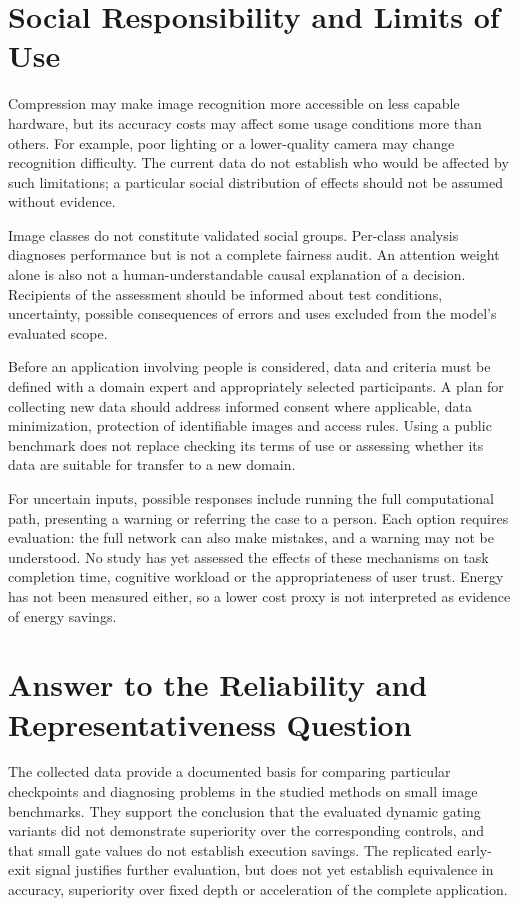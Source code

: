\documentclass[12pt,a4paper]{article}
\begin{document}
\section{Social Responsibility and Limits of Use}

Compression may make image recognition more accessible on less capable
hardware, but its accuracy costs may affect some usage conditions
more than others.
For example, poor lighting or a lower-quality camera may change
recognition difficulty.
The current data do not establish who would be affected by such
limitations; a particular social distribution of effects should not
be assumed without evidence.

Image classes do not constitute validated social groups.
Per-class analysis diagnoses performance but is not a complete fairness
audit. An attention weight alone is also not a human-understandable
causal explanation of a decision.
Recipients of the assessment should be informed about test conditions,
uncertainty, possible consequences of errors and uses excluded
from the model's evaluated scope.

Before an application involving people is considered, data and criteria
must be defined with a domain expert and appropriately selected
participants.
A plan for collecting new data should address informed consent where
applicable, data minimization, protection of identifiable images
and access rules.
Using a public benchmark does not replace checking its terms of use
or assessing whether its data are suitable for transfer to a new domain.

For uncertain inputs, possible responses include running the full
computational path, presenting a warning or referring the case to
a person. Each option requires evaluation: the full network can also
make mistakes, and a warning may not be understood.
No study has yet assessed the effects of these mechanisms on task
completion time, cognitive workload or the appropriateness of user trust.
Energy has not been measured either, so a lower cost proxy is not
interpreted as evidence of energy savings.

\section{Answer to the Reliability and Representativeness Question}

The collected data provide a documented basis for comparing particular
checkpoints and diagnosing problems in the studied methods on small
image benchmarks.
They support the conclusion that the evaluated dynamic gating variants
did not demonstrate superiority over the corresponding controls,
and that small gate values do not establish execution savings.
The replicated early-exit signal justifies further evaluation,
but does not yet establish equivalence in accuracy, superiority
over fixed depth or acceleration of the complete application.
\end{document}
